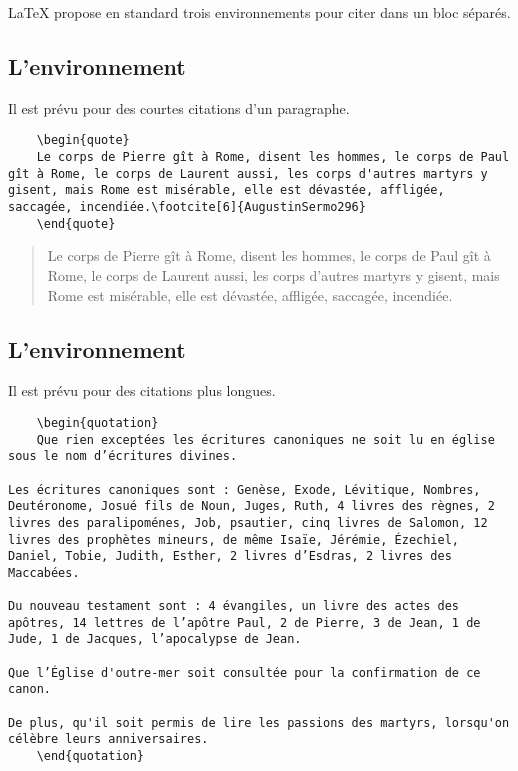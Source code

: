 LaTeX propose en standard trois environnements pour citer dans un bloc séparés.

\subsection{L'environnement }

Il est prévu pour des courtes citations d'un paragraphe.

\begin{verbatim}
	\begin{quote}
	Le corps de Pierre gît à Rome, disent les hommes, le corps de Paul gît à Rome, le corps de Laurent aussi, les corps d'autres martyrs y gisent, mais Rome est misérable, elle est dévastée, affligée, saccagée, incendiée.\footcite[6]{AugustinSermo296}
	\end{quote}
\end{verbatim}


	\begin{quote}
	Le corps de Pierre gît à Rome, disent les hommes, le corps de Paul gît à Rome, le corps de Laurent aussi, les corps d'autres martyrs y gisent, mais Rome est misérable, elle est dévastée, affligée, saccagée, incendiée.
	\end{quote}

\subsection{L'environnement }

Il est prévu pour des citations plus longues.

\begin{verbatim}
	\begin{quotation}
	Que rien exceptées les écritures canoniques ne soit lu en église sous le nom d’écritures divines.

Les écritures canoniques sont : Genèse, Exode, Lévitique, Nombres, Deutéronome, Josué fils de Noun, Juges, Ruth, 4 livres des règnes, 2 livres des paralipoménes, Job, psautier, cinq livres de Salomon, 12 livres des prophètes mineurs, de même Isaïe, Jérémie, Ézechiel, Daniel, Tobie, Judith, Esther, 2 livres d’Esdras, 2 livres des Maccabées.

Du nouveau testament sont : 4 évangiles, un livre des actes des apôtres, 14 lettres de l’apôtre Paul, 2 de Pierre, 3 de Jean, 1 de Jude, 1 de Jacques, l’apocalypse de Jean.

Que l’Église d'outre-mer soit consultée pour la confirmation de ce canon.

De plus, qu'il soit permis de lire les passions des martyrs, lorsqu'on célèbre leurs anniversaires.
	\end{quotation}
\end{verbatim}

